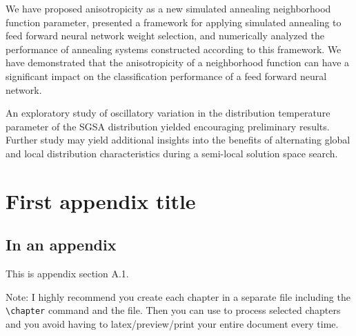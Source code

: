 \documentclass[11pt]{afthesis}
\begin{document}
	We have proposed anisotropicity as a new simulated annealing neighborhood function parameter, presented a framework for applying simulated annealing to feed forward neural network weight selection, and numerically analyzed the performance of annealing systems constructed according to this framework. We have demonstrated that the anisotropicity of a neighborhood function can have a significant impact on the classification performance of a feed forward neural network.  
	
	An exploratory study of oscillatory variation in the distribution temperature parameter of the SGSA distribution yielded encouraging preliminary results. Further study may yield additional insights into the benefits of alternating global and local distribution characteristics during a semi-local solution space search.
	
	\label{scn:conclusion}
	\appendix		%
	
	\chapter{First appendix title}
	
	\section{In an appendix} 
	
	This is appendix section A.1.
	
	Note: I highly recommend you create each chapter in a separate file
	including the \verb|\chapter| command and \verb|| the file.
	Then you can use \verb|| to process selected chapters and
	you avoid having to latex/preview/print your entire document every
	time.
	
	
	
\end{document}
